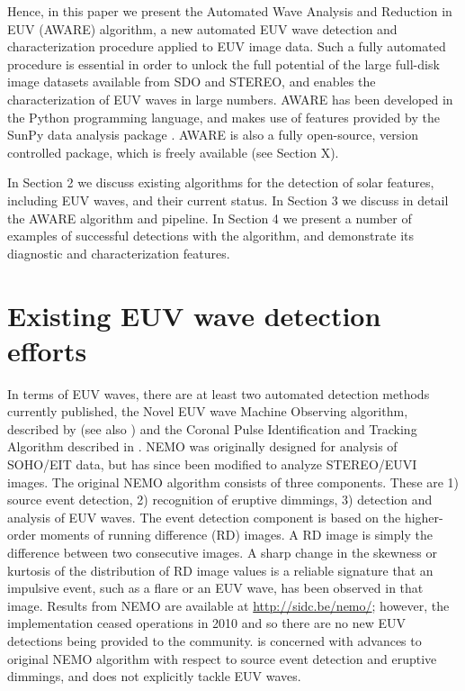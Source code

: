 \documentclass[referee,a4paper,12pt,traditabstract]{swsc}
\begin{document}
\begin{linenumbers}
Hence, in this paper we present the Automated
Wave Analysis and Reduction in EUV (AWARE) algorithm, a new automated
EUV wave detection and characterization procedure applied to EUV image
data. Such a fully automated procedure is essential in order to unlock
the full potential of the large full-disk image datasets available
from SDO and STEREO, and enables the characterization of EUV waves in
large numbers. AWARE has been developed in the Python programming
language, and makes use of features provided by the SunPy data
analysis package \citep{mumford-proc-scipy-2013}. AWARE is also a
fully open-source, version controlled package, which is freely
available (see Section X).


In Section 2 we discuss existing algorithms for the detection of solar
features, including EUV waves, and their current status. In Section 3
we discuss in detail the AWARE algorithm and pipeline. In Section 4 we
present a number of examples of successful detections with the
algorithm, and demonstrate its diagnostic and characterization
features.

\section{Existing EUV wave detection efforts}\label{sec:existing}

In terms of EUV waves, there are at least two automated detection
methods currently published, the Novel EUV wave Machine Observing
algorithm, described by \cite{2005SoPh..228..265P} (see also
\cite{2012SoPh..276..479P}) and the Coronal Pulse Identification and
Tracking Algorithm described in \cite{2014SoPh..289.3279L}. NEMO was
originally designed for analysis of SOHO/EIT data, but has since been
modified to analyze STEREO/EUVI images. The original NEMO algorithm
\cite{2005SoPh..228..265P} consists of three components. These are 1)
source event detection, 2) recognition of eruptive dimmings, 3)
detection and analysis of EUV waves. The event detection component is
based on the higher-order moments of running difference (RD) images. A
RD image is simply the difference between two consecutive images. A
sharp change in the skewness or kurtosis of the distribution of RD
image values is a reliable signature that an impulsive event, such as
a flare or an EUV wave, has been observed in that image.  Results from
NEMO are available at \url{http://sidc.be/nemo/}; however, the
implementation ceased operations in 2010 and so there are no new EUV
detections being provided to the community.
\cite{2012SoPh..276..479P} is concerned with advances to original NEMO
algorithm with respect to source event detection and eruptive
dimmings, and does not explicitly tackle EUV waves.


\end{linenumbers}
\end{document}
